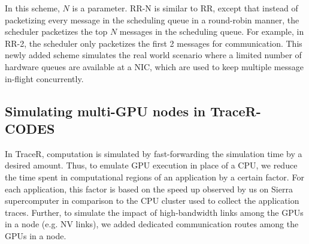 \vspace{0.08in}
 In this scheme, $N$ is a parameter. RR-N is similar to RR,
except that instead of packetizing every message in the scheduling queue in
a round-robin manner,
the scheduler packetizes the top $N$ messages in the scheduling queue. For example,
in RR-2, the scheduler only packetizes the first 2 messages for communication.
This newly added scheme simulates the real world scenario where a limited
number of hardware queues are available at a NIC, which are used to keep
multiple message in-flight concurrently.

\subsection{Simulating multi-GPU nodes in TraceR-CODES}
\label{sec:gpu_tracer}

In TraceR, computation is simulated by fast-forwarding the simulation time by a
desired amount. Thus, to emulate GPU execution in place of a CPU, we 
reduce the time spent in computational regions of an application
by a certain factor. For each application, this factor is based on the 
speed up observed by us on Sierra supercomputer in comparison to the CPU cluster
used to collect the application traces. Further, to simulate the impact of 
high-bandwidth links among the GPUs in a node (e.g. NV links), we added dedicated 
communication routes among the GPUs in a node.
